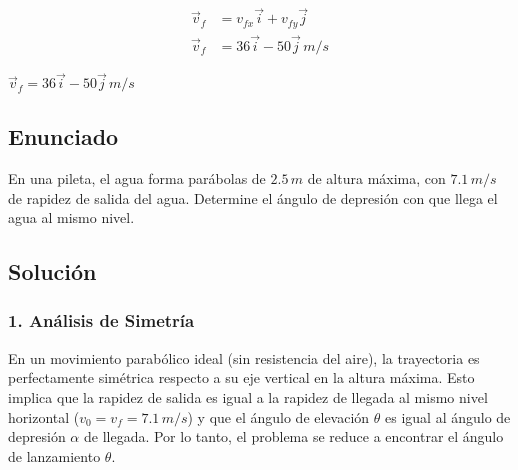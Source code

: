 \documentclass[12pt, a4paper]{article}
\begin{document}
\begin{align*}
\vec{v}_f &= v_{fx}\vec{i} + v_{fy}\vec{j} \\
\vec{v}_f &= 36\vec{i} - 50\vec{j} \, \si{m/s}
\end{align*}

\begin{tcolorbox}[colback=green!5!white, colframe=green!50!black, title=Respuesta Final]
\centering \Large $\vec{v}_f = 36\vec{i} - 50\vec{j} \, \si{m/s}$
\end{tcolorbox}

\newpage

\subsection*{Enunciado}
En una pileta, el agua forma parábolas de $2.5 \, \si{m}$ de altura máxima, con $7.1 \, \si{m/s}$ de rapidez de salida del agua. Determine el ángulo de depresión con que llega el agua al mismo nivel.

\begin{center}
\end{center}

\subsection*{Solución}

\subsubsection*{1. Análisis de Simetría}
En un movimiento parabólico ideal (sin resistencia del aire), la trayectoria es perfectamente simétrica respecto a su eje vertical en la altura máxima. Esto implica que la rapidez de salida es igual a la rapidez de llegada al mismo nivel horizontal ($v_0 = v_f = 7.1 \, \si{m/s}$) y que el ángulo de elevación $\theta$ es igual al ángulo de depresión $\alpha$ de llegada.
Por lo tanto, el problema se reduce a encontrar el ángulo de lanzamiento $\theta$.
\end{document}
